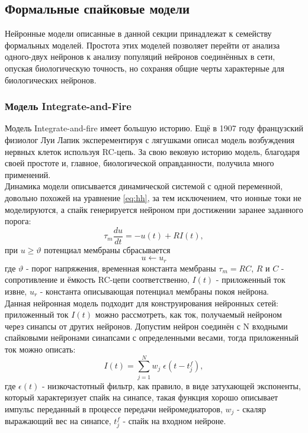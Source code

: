 \documentclass[a4paper,10pt]{article}
\begin{document}
\subsection{Формальные спайковые модели}   
\indent Нейронные модели описанные в данной секции принадлежат к семейству формальных моделей. Простота этих моделей позволяет перейти от анализа одного-двух нейронов к анализу популяций нейронов соединённых в сети, опуская биологическую точность, но сохраняя общие черты характерные для биологических нейронов.\\
\subsubsection{Модель Integrate-and-Fire}

\indent Модель Integrate-and-fire имеет большую историю. Ещё в 1907 году 	французский физиолог Луи Лапик эксперементируя с лягушками описал модель возбуждения нервных клеток используя RC-цепь\cite{Lapicque}. За свою вековую историю модель, благодаря своей простоте и, главное, биологической оправданности, получила много применений.\\
   \indent Динамика модели описывается динамической системой с одной переменной, довольно похожей на уравнение \eqref{eq:hh}, за тем исключением, что ионные токи не моделируются, а спайк генерируется нейроном при достижении заранее заданного порога:\\
   \begin{equation}\label{eq:iaf}
   \tau_{m}\frac{du}{dt} =-u(t)+R I(t),
   \end{equation}
при $u \geq \vartheta$ потенциал мембраны сбрасывается   
   \begin{equation}\label{eq:iaf_reset}
   u \leftarrow u_{r}
   \end{equation}
где $\vartheta$ - порог напряжения, временная константа мембраны $\tau_{m}=RC$, $R$ и $C$ - сопротивление и ёмкость RC-цепи соответственно, $I(t)$ - приложенный ток извне, $u_{r}$ - константа описывающая потенциал мембраны покоя нейрона.\\   
\indent Данная нейронная модель подходит для конструирования нейронных сетей: приложенный ток $I(t)$ можно рассмотреть, как ток, получаемый нейроном через синапсы от других нейронов. Допустим нейрон соединён с N входными спайковыми нейронами синапсами с определенными весами, тогда приложенный ток можно описать:
\begin{equation}\label{eq:iaf_syn}
I(t) = \sum_{j=1}^{N} w_{j}\; \epsilon(t-t_{j}^{f}),
\end{equation}
где $\epsilon(t)$ - низкочастотный фильтр, как правило, в виде затухающей экспоненты, который характеризует спайк на синапсе, такая функция хорошо описывает импульс переданный в процессе передачи нейромедиаторов, $w_{j}$ - скаляр выражающий вес на синапсе, $t_{j}^{f}$ - спайк на входном нейроне.\\
\end{document}
